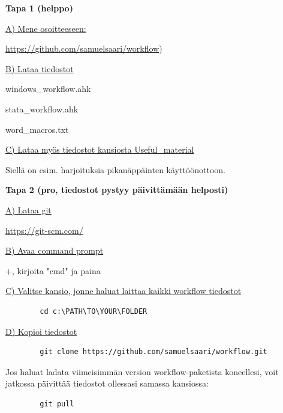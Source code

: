 \documentclass[a4paper,12pt]{scrartcl}
\begin{document}
\begin{framed}
	\textbf{Tapa 1 (helppo)}
	
	\underline{A) Mene osoitteeseen:}
	
	\url{https://github.com/samuelsaari/workflow})
	
	\medskip
	
	\underline{B) Lataa tiedostot}
	
	windows\_workflow.ahk
	
	stata\_workflow.ahk
	
	word\_macros.txt
	
	\medskip
	
	\underline{C) Lataa myös tiedostot kansiosta Useful\_material}
	
	Siellä on esim. harjoituksia pikanäppäinten käyttöönottoon.
	
	\textbf{Tapa 2 (pro, tiedostot pystyy päivittämään helposti)}
	
	\underline{A) Lataa git}
	
	\url{https://git-scm.com/}
	
	\underline{B) Avaa command prompt}
	
	+, kirjoita "cmd" ja paina 
	
	\underline{C) Valitse kansio, jonne haluat laittaa kaikki workflow tiedostot}
	\begin{verbatim}
		cd c:\PATH\TO\YOUR\FOLDER
	\end{verbatim}
	
	\underline{D) Kopioi tiedostot}
	\begin{verbatim}
		git clone https://github.com/samuelsaari/workflow.git
	\end{verbatim}
	

	Jos haluat ladata viimeisimmän version workflow-paketista koneellesi, voit jatkossa päivittää tiedostot ollessasi samassa kansiossa:
	\begin{verbatim}
		git pull
	\end{verbatim}

	\underline{}
	
	
\end{framed}
\end{document}
